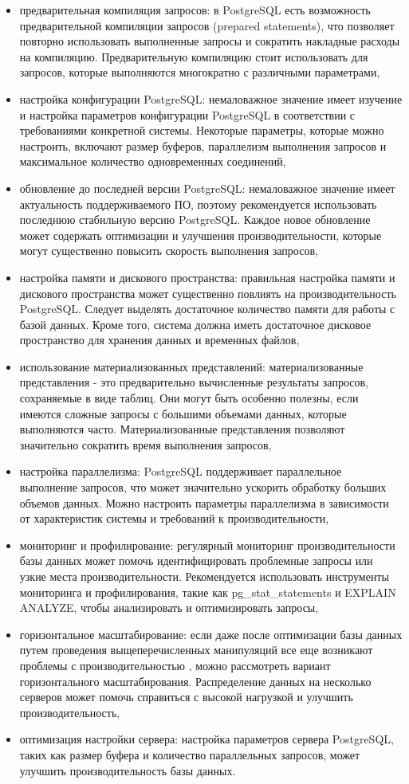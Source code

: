\begin{itemize}
    \item предварительная компиляция запросов: в PostgreSQL есть возможность предварительной компиляции запросов (prepared statements), что позволяет повторно использовать выполненные запросы и сократить накладные расходы на компиляцию. Предварительную компиляцию стоит использовать для запросов, которые выполняются многократно с различными параметрами,
    \item настройка конфигурации PostgreSQL: немаловажное значение имеет изучение и настройка параметров конфигурации PostgreSQL в соответствии с требованиями конкретной системы. Некоторые параметры, которые можно настроить, включают размер буферов, параллелизм выполнения запросов и максимальное количество одновременных соединений,
    \item обновление до последней версии PostgreSQL: немаловажное значение имеет актуальность поддерживаемого ПО, поэтому рекомендуется использовать последнюю стабильную версию PostgreSQL. Каждое новое обновление может содержать оптимизации и улучшения производительности, которые могут существенно повысить скорость выполнения запросов,
    \item настройка памяти и дискового пространства: правильная настройка памяти и дискового пространства может существенно повлиять на производительность PostgreSQL. Следует выделять достаточное количество памяти для работы с базой данных. Кроме того, система должна иметь достаточное дисковое пространство для хранения данных и временных файлов,
    \item использование материализованных представлений: материализованные представления - это предварительно вычисленные результаты запросов, сохраняемые в виде таблиц. Они могут быть особенно полезны, если имеются сложные запросы с большими объемами данных, которые выполняются часто. Материализованные представления позволяют значительно сократить время выполнения запросов,
    \item настройка параллелизма: PostgreSQL поддерживает параллельное выполнение запросов, что может значительно ускорить обработку больших объемов данных. Можно настроить параметры параллелизма в зависимости от характеристик системы и требований к производительности,
    \item мониторинг и профилирование: регулярный мониторинг производительности базы данных может помочь идентифицировать проблемные запросы или узкие места производительности. Рекомендуется использовать инструменты мониторинга и профилирования, такие как pg\_stat\_statements и EXPLAIN ANALYZE, чтобы анализировать и оптимизировать запросы,
    \item горизонтальное масштабирование: если даже после оптимизации базы данных путем проведения выщеперечисленных манипуляций все еще возникают проблемы с производительностью , можно рассмотреть вариант горизонтального масштабирования. Распределение данных на несколько серверов может помочь справиться с высокой нагрузкой и улучшить производительность,
    \item оптимизация настройки сервера: настройка параметров сервера PostgreSQL, таких как размер буфера и количество параллельных запросов, может улучшить производительность базы данных.
\end{itemize}

